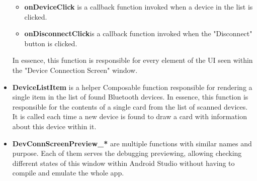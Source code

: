 \begin{itemize}
\begin{itemize}
		\item \textbf{onDeviceClick} is a callback function invoked when a device in the list is clicked.
		\item \textbf{onDisconnectClick}is a callback function invoked when the "Disconnect" button is clicked.
	\end{itemize}
	In essence, this function is responsible for every element of the \ac{UI} seen within the "Device Connection Screen" window.
	\item \textbf{DeviceListItem} is a helper Composable function responsible for rendering a single item in the list of found Bluetooth devices. In essence, this function is responsible for the contents of a single card from the list of scanned devices. It is called each time a new device is found to draw a card with information about this device within it.
	\item \textbf{DevConnScreenPreview\_*} are multiple functions with similar names and purpose. Each of them serves the debugging previewing, allowing checking different states of this window within Android Studio without having to compile and emulate the whole app.
\end{itemize}

